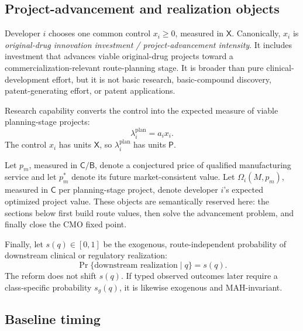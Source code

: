 \subsection{Project-advancement and realization objects}
\label{subsec:p01-advancement-realization}

Developer \(i\) chooses one common control \(x_i\geq0\), measured in
\(\mathsf X\).  Canonically, \(x_i\) is
\emph{original-drug innovation investment / project-advancement intensity}.
It includes investment that advances viable original-drug projects toward a
commercialization-relevant route-planning stage.  It is broader than pure
clinical-development effort, but it is not basic research, basic-compound
discovery, patent-generating effort, or patent applications.

Research capability converts the control into the expected measure of viable
planning-stage projects:
\begin{equation}
  \lambda_i^{\mathrm{plan}}=a_ix_i.
  \label{eq:p01-planned-intensity}
\end{equation}
The control \(x_i\) has units \(\mathsf X\), so
\(\lambda_i^{\mathrm{plan}}\) has units \(\mathsf P\).

Let \(p_m\), measured in \(\mathsf C/\mathsf B\), denote a conjectured price
of qualified manufacturing service and let \(p_m^*\) denote its future
market-consistent value.  Let \(\Omega_i(M,p_m)\), measured in \(\mathsf C\)
per planning-stage project, denote developer \(i\)'s expected optimized project
value.  These objects are semantically reserved here: the sections below first
build route values, then solve the advancement problem, and finally close the
CMO fixed point.

Finally, let \(s(q)\in[0,1]\) be the exogenous, route-independent probability
of downstream clinical or regulatory realization:
\begin{equation}
  \Pr\{\text{downstream realization}\mid q\}=s(q).
  \label{eq:p01-downstream-probability}
\end{equation}
The reform does not shift \(s(q)\).  If typed observed outcomes later require a
class-specific probability \(s_g(q)\), it is likewise exogenous and
MAH-invariant.

\subsection{Baseline timing}
\label{subsec:p01-timing}

